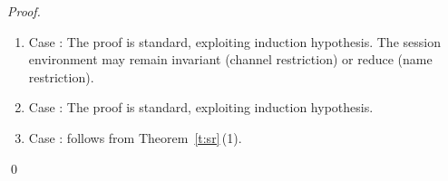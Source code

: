 \begin{proof}
\begin{enumerate}[1.]
		\item	Case :
			The proof is standard, exploiting induction hypothesis.
			The session environment may remain invariant (channel restriction)  or reduce (name restriction).

		\item	Case :
			The proof is standard, exploiting induction hypothesis. 

		\item	Case :
			follows from Theorem~\ref{t:sr}\,(1).
	\end{enumerate}
	\qed
\end{proof}
